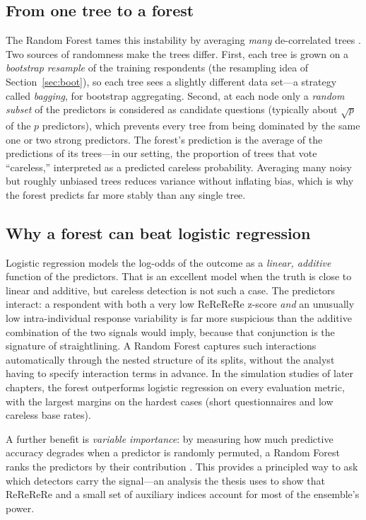 \documentclass[doc,11pt,donotrepeattitle]{apa7}
\begin{document}
\subsection{From one tree to a forest}

The Random Forest tames this instability by averaging \emph{many}
de-correlated trees \parencite{breiman2001random}. Two sources of randomness
make the trees differ. First, each tree is grown on a \emph{bootstrap resample}
of the training respondents (the resampling idea of Section~\ref{sec:boot}),
so each tree sees a slightly different data set---a strategy called
\emph{bagging}, for bootstrap aggregating. Second, at each node only a
\emph{random subset} of the predictors is considered as candidate questions
(typically about $\sqrt{p}$ of the $p$ predictors), which prevents every tree
from being dominated by the same one or two strong predictors. The forest's
prediction is the average of the predictions of its trees---in our setting, the
proportion of trees that vote ``careless,'' interpreted as a predicted careless
probability. Averaging many noisy but roughly unbiased trees reduces variance
without inflating bias, which is why the forest predicts far more stably than any
single tree.

\subsection{Why a forest can beat logistic regression}

Logistic regression models the log-odds of the outcome as a \emph{linear,
additive} function of the predictors. That is an excellent model when the truth
is close to linear and additive, but careless detection is not such a case. The
predictors interact: a respondent with both a very low ReReReRe z-score
\emph{and} an unusually low intra-individual response variability is far more
suspicious than the additive combination of the two signals would imply, because
that conjunction is the signature of straightlining. A Random Forest captures
such interactions automatically through the nested structure of its splits,
without the analyst having to specify interaction terms in advance. In the
simulation studies of later chapters, the forest outperforms logistic regression
on every evaluation metric, with the largest margins on the hardest cases (short
questionnaires and low careless base rates).

A further benefit is \emph{variable importance}: by measuring how much
predictive accuracy degrades when a predictor is randomly permuted, a Random
Forest ranks the predictors by their contribution \parencite{strobl2008conditional}.
This provides a principled way to ask which detectors carry the signal---an
analysis the thesis uses to show that ReReReRe and a small set of auxiliary
indices account for most of the ensemble's power.
\end{document}
